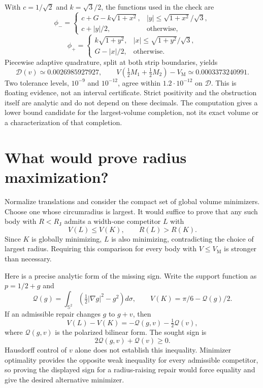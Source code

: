 \documentclass[11pt]{article}
\theoremstyle{remark}\newtheorem{remark}[theorem]{Remark}
\newcommand{\VM}{V_{\mathrm M}}
\newcommand{\RJ}{R_{\mathrm J}}
\newcommand{\Q}{\mathcal Q}
\begin{document}
With $c=1/\sqrt2$ and $k=\sqrt3/2$, the functions used in the check are
\[
 \phi_-=
 \begin{cases}c+G-k\sqrt{1+x^2},&|y|\leq\sqrt{1+x^2}/\sqrt3,\\
 c+|y|/2,&\text{otherwise},\end{cases}
\]
\[
 \phi_+=
 \begin{cases}k\sqrt{1+y^2},&|x|\leq\sqrt{1+y^2}/\sqrt3,\\
 G-|x|/2,&\text{otherwise}.\end{cases}
\]
Piecewise adaptive quadrature, split at both strip boundaries, yields
\[
 \mathcal D(v)\simeq0.0026985927927,\qquad
 V\left(\tfrac12M_1+\tfrac12M_2\right)-\VM
 \simeq0.0003373240991.
\]
Two tolerance levels, $10^{-9}$ and $10^{-12}$, agree within $1.2\cdot10^{-12}$ on $\mathcal D$. This is floating evidence, not an interval certificate. Strict positivity and the obstruction itself are analytic and do not depend on these decimals. The computation gives a lower bound candidate for the largest-volume completion, not its exact volume or a characterization of that completion.


\section{What would prove radius maximization?}
Normalize translations and consider the compact set of global volume
minimizers. Choose one whose circumradius is largest. It would suffice
to prove that any such body with $R<\RJ$ admits a width-one competitor
$L$ with
\[
 V(L)\leq V(K),\qquad R(L)>R(K).
\]
Since $K$ is globally minimizing, $L$ is also minimizing, contradicting
the choice of largest radius. Requiring this comparison for every body
with $V\leq\VM$ is stronger than necessary.

Here is a precise analytic form of the missing sign. Write the support
function as $p=1/2+g$ and
\[
 \Q(g)=\int_{\mathbb S^2}\left(\tfrac12|\nabla g|^2-g^2\right)d\sigma,
 \qquad V(K)=\pi/6-\Q(g)/2.
\]
If an admissible repair changes $g$ to $g+v$, then
\[
 V(L)-V(K)=-\Q(g,v)-\tfrac12\Q(v),
\]
where $\Q(g,v)$ is the polarized bilinear form. The sought sign is
\[
 \boxed{2\Q(g,v)+\Q(v)\geq0.}
\]
Hausdorff control of $v$ alone does not establish this inequality.
Minimizer optimality provides the opposite weak inequality for every
admissible competitor, so proving the displayed sign for a radius-raising
repair would force equality and give the desired alternative minimizer.
\end{document}
